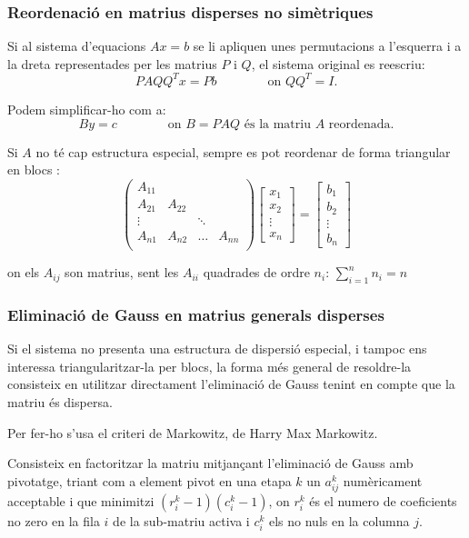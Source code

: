 \documentclass[8pt]{beamer}
\begin{document}
\begin{frame}
  \frametitle{Reordenació en matrius disperses no simètriques}

Si al sistema d'equacions $Ax=b$ se li apliquen unes permutacions a l'esquerra i a la dreta representades per les matrius $P$ i $Q$, el sistema original es reescriu:
\[PAQQ^Tx = Pb \qquad \qquad \text{on $QQ^T = I$.}\]


Podem simplificar-ho com a:
\[By = c \qquad \qquad \text{on $B = PAQ$ és la matriu $A$ reordenada.} \]

Si $A$ no té cap estructura especial, sempre es pot reordenar de forma triangular en blocs : 
\[
\begin{pmatrix}
A_{11}	\\
A_{21}	&	A_{22}	\\
\vdots		&	& \ddots	&	\\
A_{n1}	&	A_{n2}	&	\dots	&	A_{nn}	\\
\end{pmatrix}
\begin{bmatrix}
x_1 \\ x_2 \\ \vdots \\ x_n
\end{bmatrix}
=
\begin{bmatrix}
b_1 \\ b_2 \\ \vdots \\ b_n
\end{bmatrix}
\]

on els $A_{ij}$ son matrius, sent les $A_{ii}$ quadrades de ordre $n_i$: $\sum_{i = 1}^n n_i = n$

  
\end{frame}


\begin{frame}
  \frametitle{Eliminació de Gauss en matrius generals disperses}

Si el sistema no presenta una estructura de dispersió especial, i tampoc ens interessa triangularitzar-la per blocs, la forma més general de resoldre-la consisteix en utilitzar directament l'eliminació de Gauss tenint en compte que la matriu és dispersa.

Per fer-ho s'usa el criteri de Markowitz, de Harry Max Markowitz.

Consisteix en factoritzar la matriu mitjançant l'eliminació de Gauss amb pivotatge, triant com a element pivot en una etapa $k$ un $a_{ij}^k$ numèricament acceptable i que minimitzi $(r_i^k - 1)(c_i^k - 1)$, on $r_i^k$ és el numero de coeficients no zero en la fila $i$ de la sub-matriu activa i $c_i^k$ els no nuls en la columna $j$.

\end{frame}
\end{document}
